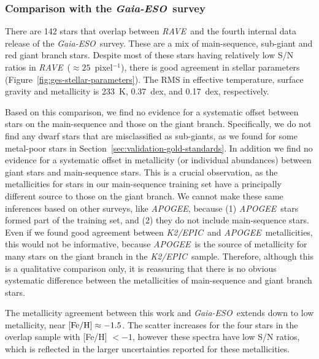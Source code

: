 \documentclass[preprint,trackchanges]{aastex}
\newcommand{\acronym}[1]{{\small{#1}}}
\newcommand{\project}[1]{\textsl{#1}}
\newcommand{\rave}{\project{\acronym{RAVE}}}
\newcommand{\ges}{\project{Gaia-ESO}}
\newcommand{\apogee}{\project{\acronym{APOGEE}}}
\newcommand{\epic}{\project{K2/EPIC}}
\begin{document}
\subsubsection{Comparison with the \ges\ survey}
\label{sec:validation-ges}

There are 142 stars that overlap between \rave\ and the fourth internal
data release of the \ges\ survey. These are a mix of main-sequence, 
sub-giant and red giant branch stars.  Despite most of these stars having
relatively low S/N ratios in \rave\ ($\approx 25$~pixel$^{-1}$), there is good 
agreement in stellar parameters (Figure~\ref{fig:ges-stellar-parameters}).  
The RMS in effective temperature, surface gravity and metallicity is
233~K, 0.37~dex, and 0.17~dex, respectively.  


Based on this comparison, we find no evidence for a systematic offset 
between stars on the main-sequence and those on the giant branch. Specifically,
we do not find any dwarf stars that are misclassified as sub-giants, as we
found for some metal-poor stars in Section~\ref{sec:validation-gold-standards}.
In addition we find no evidence for a systematic offset in metallicity (or
individual abundances) between giant stars and main-sequence stars.  This is
a crucial observation, as the metallicities for stars in our main-sequence
training set have a principally different source to those on the giant branch.
We cannot make these same inferences based on other surveys, like \apogee,
because (1) \apogee\ stars formed part of the training set, and (2) they do
not include main-sequence stars.  Even if we found good agreement between
\epic\ and \apogee\ metallicities, this would not be informative, because
\apogee\ is the source of metallicity for many stars on the giant branch in
the \epic\ sample. Therefore, although this is a qualitative comparison only,
it is reassuring that there is no obvious systematic difference between the
metallicities of main-sequence and giant branch stars.


The metallicity agreement between this work and \ges\ extends down to low
metallicity, near $[{\rm Fe/H}] \approx -1.5$.  The scatter increases for
the four stars in the overlap sample with [Fe/H] $< -1$, however these
spectra have low S/N ratios, which is reflected in the larger uncertainties
reported for these metallicities.
\end{document}
